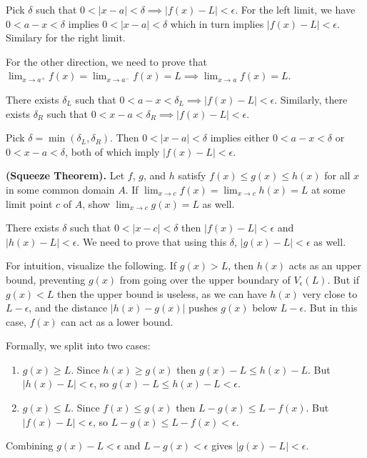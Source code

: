 \documentclass{oxmathproblems}
\begin{document}
\begin{questions}
\begin{solution}
\begin{enumerate}[label=(\alph*)]
    Pick $\delta$ such that $0 < |x-a| < \delta \implies |f(x)-L| < \epsilon$. For the left limit, we have $0 < a-x < \delta$ implies
    $0 < |x-a| < \delta$ which in turn implies $|f(x) - L| < \epsilon$. Similary for the right limit.

    For the other direction, we need to prove that $\lim_{x \to a^{+}}f(x) = \lim_{x \to a^{-}}f(x) = L \implies \lim_{x \to a} f(x) = L$.

    There exists $\delta_{L}$ such that $0 < a-x < \delta_{L} \implies |f(x) - L| < \epsilon$. Similarly, there exists $\delta_{R}$ such that
    $0 < x-a < \delta_{R} \implies |f(x) - L| < \epsilon$.

    Pick $\delta = \min(\delta_{L}, \delta_{R})$. Then $0 < |x-a| < \delta$ implies either $0 < a-x < \delta$ or $0 < x-a < \delta$, both of which
    imply $|f(x) - L| < \epsilon$.
  \end{enumerate}
\end{solution}

\miquestion \textbf{(Squeeze Theorem).} Let $f$, $g$, and $h$ satisfy $f(x) \leq g(x) \leq h(x)$ for all $x$ in some common domain $A$. If
$\lim_{x \to c}f(x) = \lim_{x \to c}h(x) = L$ at some limit point $c$ of $A$, show $\lim_{x \to c}g(x)=L$ as well.

\begin{solution}
  There exists $\delta$ such that $0 < |x-c| < \delta$ then $|f(x) - L| < \epsilon$ and $|h(x) - L| < \epsilon$. We need to prove that 
  using this $\delta$, $|g(x) - L| < \epsilon$ as well.

  For intuition, visualize the following. If $g(x) > L$, then $h(x)$ acts as an upper bound, preventing $g(x)$ from going over the upper boundary of $V_{\epsilon}(L)$.
  But if $g(x) < L$ then the upper bound is useless, as we can have $h(x)$ very close to $L-\epsilon$, and the distance $|h(x)-g(x)|$ pushes $g(x)$ below $L-\epsilon$.
  But in this case, $f(x)$ can act as a lower bound.

  Formally, we split into two cases:
  \begin{enumerate}
    \item $g(x) \geq L$. Since $h(x) \geq g(x)$ then $g(x)-L \leq h(x)-L$. But $|h(x)-L| < \epsilon$, so $g(x)-L \leq h(x)-L < \epsilon$.
    \item $g(x) \leq L$. Since $f(x) \leq g(x)$ then $L-g(x) \leq L-f(x)$. But $|f(x)-L| < \epsilon$, so $L-g(x) \leq L-f(x) < \epsilon$.
  \end{enumerate}

  Combining $g(x)-L < \epsilon$ and $L-g(x) < \epsilon$ gives $|g(x)-L| < \epsilon$.
\end{solution}

\end{questions}
\end{document}
